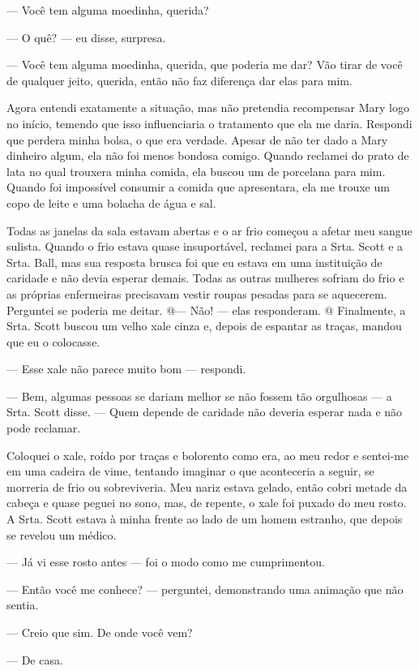 --- Você tem alguma moedinha, querida?

--- O quê? --- eu disse, surpresa.

--- Você tem alguma moedinha, querida, que poderia me dar? Vão tirar de
você de qualquer jeito, querida, então não faz diferença dar elas para
mim.

Agora entendi exatamente a situação, mas não pretendia recompensar Mary
logo no início, temendo que isso influenciaria o tratamento que ela me
daria. Respondi que perdera minha bolsa, o que era verdade. Apesar de
não ter dado a Mary dinheiro algum, ela não foi menos bondosa comigo.
Quando reclamei do prato de lata no qual trouxera minha comida, ela
buscou um de porcelana para mim. Quando foi impossível consumir a comida
que apresentara, ela me trouxe um copo de leite e uma bolacha de água e
sal.

Todas as janelas da sala estavam abertas e o ar frio começou a afetar
meu sangue sulista. Quando o frio estava quase insuportável, reclamei
para a Srta. Scott e a Srta. Ball, mas sua resposta brusca foi que eu
estava em uma instituição de caridade e não devia esperar demais. Todas
as outras mulheres sofriam do frio e as próprias enfermeiras precisavam
vestir roupas pesadas para se aquecerem. Perguntei se poderia me deitar.
@--- Não! --- elas responderam. @ Finalmente, a Srta. Scott buscou um
velho xale cinza e, depois de espantar as traças, mandou que eu o
colocasse.

--- Esse xale não parece muito bom --- respondi.

--- Bem, algumas pessoas se dariam melhor se não fossem tão orgulhosas
--- a Srta. Scott disse. --- Quem depende de caridade não deveria
esperar nada e não pode reclamar.

Coloquei o xale, roído por traças e bolorento como era, ao meu redor e
sentei-me em uma cadeira de vime, tentando imaginar o que aconteceria a
seguir, se morreria de frio ou sobreviveria. Meu nariz estava gelado,
então cobri metade da cabeça e quase peguei no sono, mas, de repente, o
xale foi puxado do meu rosto. A Srta. Scott estava à minha frente ao
lado de um homem estranho, que depois se revelou um médico.

--- Já vi esse rosto antes --- foi o modo como me cumprimentou.

--- Então você me conhece? --- perguntei, demonstrando uma animação que
não sentia.

--- Creio que sim. De onde você vem?

--- De casa.

